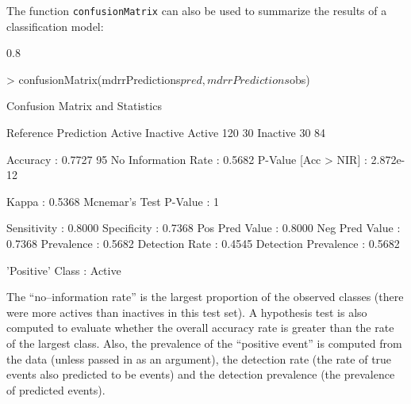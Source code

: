 \documentclass[12pt]{article}
\newcommand{\code}[1]{\mbox{\footnotesize\color{darkblue}\texttt{#1}}}
\renewenvironment{Schunk}{\vspace{\topsep}}{\vspace{\topsep}}
\begin{document}
The function \code{confusionMatrix} can also be used to summarize
the results of a classification model: 

\begin{small}
\begin{Schunk}
\begin{Soutput}
[1] 0.8
\end{Soutput}
\begin{Sinput}
> confusionMatrix(mdrrPredictions$pred, mdrrPredictions$obs)
\end{Sinput}
\begin{Soutput}
Confusion Matrix and Statistics

          Reference
Prediction Active Inactive
  Active      120       30
  Inactive     30       84
                                          
               Accuracy : 0.7727          
                 95%
    No Information Rate : 0.5682          
    P-Value [Acc > NIR] : 2.872e-12       
                                          
                  Kappa : 0.5368          
 Mcnemar's Test P-Value : 1               
                                          
            Sensitivity : 0.8000          
            Specificity : 0.7368          
         Pos Pred Value : 0.8000          
         Neg Pred Value : 0.7368          
             Prevalence : 0.5682          
         Detection Rate : 0.4545          
   Detection Prevalence : 0.5682          
                                          
       'Positive' Class : Active          
\end{Soutput}
\end{Schunk}
\end{small}

The ``no--information rate'' is the largest proportion of the observed
classes (there were more actives than inactives in this test set). A
hypothesis test is also computed to evaluate whether the overall
accuracy rate is greater than the rate of the largest class. Also, the
prevalence of the ``positive event'' is computed from the data (unless
passed in as an argument), the detection rate (the rate of true events
also predicted to be events) and the detection prevalence (the
prevalence of predicted events). 
\end{document}
